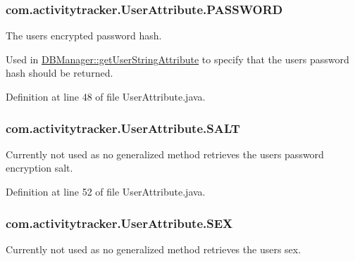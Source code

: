 \subsubsection[{\texorpdfstring{P\+A\+S\+S\+W\+O\+RD}{PASSWORD}}]{\setlength{\rightskip}{0pt plus 5cm}com.\+activitytracker.\+User\+Attribute.\+P\+A\+S\+S\+W\+O\+RD}\hypertarget{enumcom_1_1activitytracker_1_1_user_attribute_aa893eac0362a28e73a599ce1ba141d40}{}\label{enumcom_1_1activitytracker_1_1_user_attribute_aa893eac0362a28e73a599ce1ba141d40}
The user\textquotesingle{}s encrypted password hash.

Used in \hyperlink{classcom_1_1activitytracker_1_1_d_b_manager_a20f726c054d6c8a6fc3ce629d87f1114}{D\+B\+Manager\+::get\+User\+String\+Attribute} to specify that the user\textquotesingle{}s password hash should be returned. 

Definition at line 48 of file User\+Attribute.\+java.

\subsubsection[{\texorpdfstring{S\+A\+LT}{SALT}}]{\setlength{\rightskip}{0pt plus 5cm}com.\+activitytracker.\+User\+Attribute.\+S\+A\+LT}\hypertarget{enumcom_1_1activitytracker_1_1_user_attribute_acd286be9d131a84a2be02e1cdac4c848}{}\label{enumcom_1_1activitytracker_1_1_user_attribute_acd286be9d131a84a2be02e1cdac4c848}
Currently not used as no generalized method retrieves the user\textquotesingle{}s password encryption salt. 

Definition at line 52 of file User\+Attribute.\+java.

\subsubsection[{\texorpdfstring{S\+EX}{SEX}}]{\setlength{\rightskip}{0pt plus 5cm}com.\+activitytracker.\+User\+Attribute.\+S\+EX}\hypertarget{enumcom_1_1activitytracker_1_1_user_attribute_a53fe928fb805b69c606a351aac257558}{}\label{enumcom_1_1activitytracker_1_1_user_attribute_a53fe928fb805b69c606a351aac257558}
Currently not used as no generalized method retrieves the user\textquotesingle{}s sex. 

